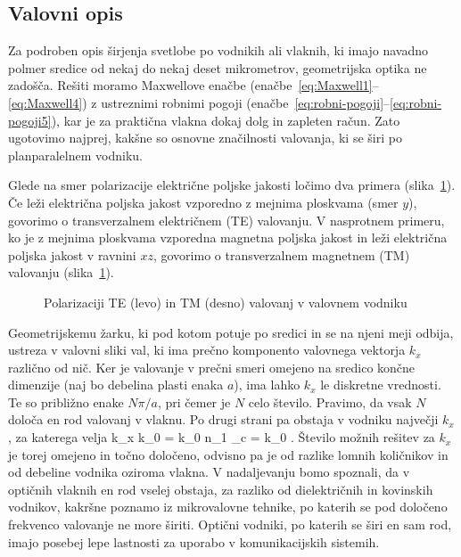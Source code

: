 \subsection*{Valovni opis}
Za podroben opis širjenja svetlobe po vodnikih ali vlaknih, 
ki imajo navadno polmer
sredice od nekaj do nekaj deset mikrometrov, geometrijska optika ne
zadošča. Rešiti moramo Maxwellove enačbe (enačbe~\ref{eq:Maxwell1}--\ref{eq:Maxwell4}) 
z ustreznimi robnimi pogoji (enačbe~\ref{eq:robni-pogoji}--\ref{eq:robni-pogoji5}),
kar je za praktična vlakna dokaj dolg in zapleten račun. Zato ugotovimo najprej, kakšne
so osnovne značilnosti valovanja, ki se širi po planparalelnem vodniku.

Glede na smer polarizacije električne poljske jakosti 
ločimo dva primera (slika~\ref{fig:TETM}). Če leži električna poljska
jakost vzporedno z mejnima ploskvama (smer $y$), 
govorimo o transverzalnem električnem (TE) valovanju. 
V nasprotnem primeru, ko je 
z mejnima ploskvama vzporedna magnetna poljska jakost in 
leži električna poljska jakost v ravnini $xz$, 
govorimo o transverzalnem magnetnem (TM) valovanju (slika~\ref{fig:TETM}).
\begin{figure}[h]
\centering
\def\svgwidth{140truemm} 

\caption{Polarizaciji TE (levo) in TM (desno) valovanj v valovnem vodniku}
\label{fig:TETM}
\end{figure}

Geometrijskemu žarku, ki pod kotom potuje po sredici in se na njeni meji
odbija, ustreza v valovni sliki val, ki ima prečno komponento valovnega
vektorja $k_{x}$ različno od nič. Ker je valovanje v prečni smeri 
omejeno na sredico končne dimenzije (naj bo debelina plasti enaka $a$), ima lahko
$k_{x}$ le diskretne vrednosti. Te so približno enake $N\pi/a$, pri čemer je $N$
celo število. Pravimo, da vsak $N$ določa en rod valovanj v vlaknu. Po drugi strani 
pa obstaja v vodniku največji $k_x$, za katerega velja
\beq
k_{x } \approx k_0 \sin\alpha = k_0 n_1 \cos\vartheta_c = k_0 .
\eeq
Število možnih rešitev za $k_x$ je torej omejeno in točno določeno, odvisno
pa je od razlike lomnih količnikov in od debeline vodnika oziroma vlakna. 
V nadaljevanju bomo spoznali, da v optičnih vlaknih en rod vselej obstaja,
za razliko od dielektričnih in kovinskih vodnikov, kakršne
poznamo iz mikrovalovne tehnike, po katerih se pod določeno frekvenco
valovanje ne more širiti. Optični vodniki, po katerih se širi
en sam rod, imajo posebej lepe lastnosti za uporabo v komunikacijskih
sistemih.

